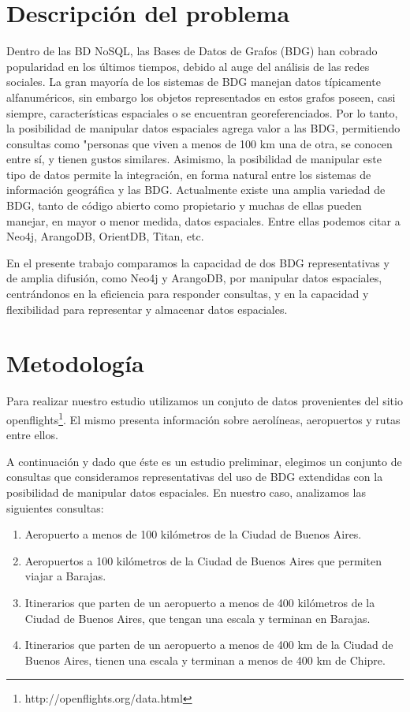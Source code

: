 \documentclass{llncs}
\begin{document}
\section{Descripción del problema}
\vspace{-0.5em}
Dentro de las BD NoSQL, las Bases de Datos de Grafos (BDG) han cobrado popularidad en los últimos tiempos, debido al auge del análisis de las redes sociales.
La gran mayoría de los sistemas de BDG manejan datos típicamente alfanuméricos, sin embargo los objetos representados en estos grafos poseen, casi siempre, características espaciales o se encuentran georeferenciados.
Por lo tanto, la posibilidad de manipular datos espaciales agrega valor a las BDG, permitiendo consultas como "personas que viven a menos de 100 km una de otra, se conocen entre sí, y tienen gustos similares.
Asimismo, la posibilidad de manipular este tipo de datos permite la integración, en forma natural entre los sistemas de información geográfica y las BDG.
Actualmente existe una amplia variedad de BDG, tanto de código abierto como propietario y muchas de ellas pueden manejar, en mayor o menor medida, datos espaciales. Entre ellas podemos citar a Neo4j\cite{n4jsp}, ArangoDB\cite{adbgi}, OrientDB, Titan, etc.

En el presente trabajo comparamos la capacidad de dos BDG representativas y de amplia difusión, como Neo4j y ArangoDB, por manipular datos espaciales, centrándonos en la eficiencia para responder consultas, y en la capacidad y flexibilidad para representar y almacenar datos espaciales.

\section{Metodología}
\vspace{-0.5em}
Para realizar nuestro estudio utilizamos un conjuto de datos provenientes del sitio  openflights\footnote{http://openflights.org/data.html}. El mismo presenta información sobre aerolíneas, aeropuertos y rutas entre ellos.

A continuación y dado que éste es un estudio preliminar, elegimos un conjunto de consultas que consideramos representativas del uso de BDG extendidas con la posibilidad de manipular datos espaciales. En nuestro caso, analizamos las siguientes consultas:
\vspace{-0.5em}
\begin{enumerate}
\itemsep0em 
\item Aeropuerto a menos de 100 kilómetros de la Ciudad de Buenos Aires.
\item Aeropuertos a 100 kilómetros de la Ciudad de Buenos Aires que permiten viajar a Barajas.
\item Itinerarios que parten de un aeropuerto a menos de 400 kilómetros de la Ciudad de Buenos Aires, que tengan una escala y terminan en Barajas.
\item Itinerarios que parten de un aeropuerto a menos de 400 km de la Ciudad de Buenos Aires, tienen una escala y terminan a menos de 400 km de Chipre.
\end{enumerate}
\end{document}
